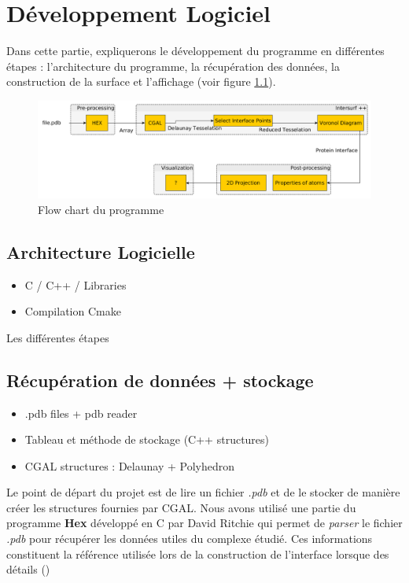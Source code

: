 \chapter{Développement Logiciel}

Dans cette partie, expliquerons le développement du programme en différentes étapes :
l'architecture du programme, la récupération des données, la construction de la surface
et l'affichage (voir figure \ref{fig::flow_chart}).

\begin{figure}[ht]
\centering
  \includegraphics[width=\textwidth]{figures/flow_chart.png}
  \caption{Flow chart du programme}
  \label{fig::flow_chart}
\end{figure}

\section{Architecture Logicielle}
\begin{itemize}
  \item C / C++ / Libraries
  \item Compilation Cmake
\end{itemize}
Les différentes étapes


\section{Récupération de données + stockage}
\begin{itemize}
  \item .pdb files + pdb reader
  \item Tableau et méthode de stockage (C++ structures)
  \item CGAL structures : Delaunay + Polyhedron
\end{itemize}

Le point de départ du projet est de lire un fichier \textit{.pdb} et de le stocker
de manière créer les structures fournies par CGAL. Nous avons utilisé une partie du programme
\textbf{Hex} développé en C par David Ritchie qui permet de \textit{parser} le fichier
\textit{.pdb} pour récupérer les données utiles du complexe étudié. Ces informations constituent
la référence utilisée lors de la construction de l'interface lorsque des détails
() 

